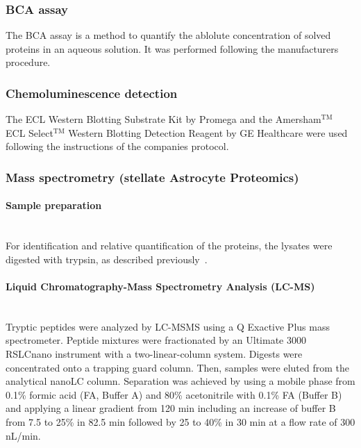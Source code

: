 \documentclass[a4paper,11pt,bibtotocnumbered]{article}
\begin{document}
\subsubsection{BCA assay}

The BCA assay is a method to quantify the ablolute concentration of solved proteins in an aqueous solution. It was performed following the manufacturers procedure.



\subsubsection{Chemoluminescence detection}


The ECL Western Blotting Substrate Kit by Promega and the Amersham$^\mathrm{TM}$ ECL Select$^\mathrm{TM}$  Western Blotting Detection Reagent by GE Healthcare were used following the instructions of the companies protocol.

\subsubsection{Mass spectrometry (stellate Astrocyte Proteomics)}


\paragraph{Sample preparation} $~$ \\

For identification and relative quantification of the proteins, the lysates were digested with trypsin, as described previously~\cite{Mueller2020}.


\paragraph{Liquid Chromatography-Mass Spectrometry Analysis (LC-MS)} $~$ \\

Tryptic peptides were analyzed by LC-MSMS using a Q Exactive Plus mass spectrometer. Peptide mixtures were fractionated by an Ultimate 3000 RSLCnano instrument with a two-linear-column system. Digests were concentrated onto a trapping guard column. Then, samples were eluted from the analytical nanoLC column. Separation was achieved by using a mobile phase from 0.1\% formic acid (FA, Buffer A) and 80\% acetonitrile with 0.1\% FA (Buffer B) and applying a linear gradient from 120 min including an increase of buffer B from 7.5 to 25\% in 82.5 min followed by 25 to 40\% in 30 min at a flow rate of 300 nL/min.
 
\end{document}
